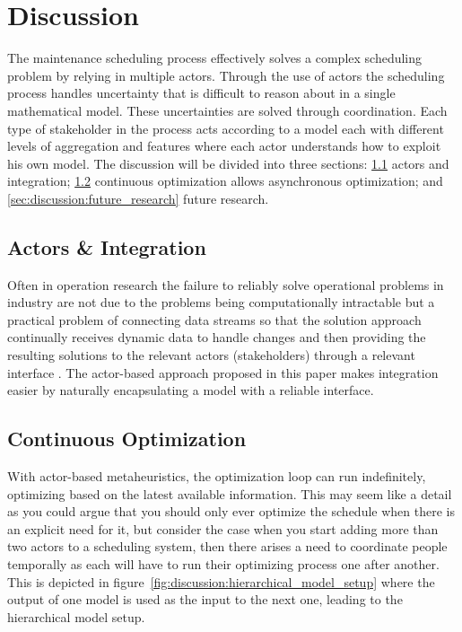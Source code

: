 \section{Discussion}
\label{sec:4-discussion}
The maintenance scheduling process effectively solves a complex scheduling problem by
relying in multiple actors. Through the use of actors the scheduling process handles
uncertainty that is difficult to reason about in a single mathematical model. These 
uncertainties are solved through coordination. Each type of stakeholder in the process 
acts according to a  model each with different levels of aggregation and features where
each actor understands how to exploit his own model.
The discussion will be divided into three sections: 
\ref{sec:discussion:actors_and_integration} 
actors and integration;
\ref{sec:discussion:continuous_optimization} 
continuous optimization allows asynchronous optimization; 
and \ref{sec:discussion:future_research} future research.

\subsection{Actors \& Integration}
\label{sec:discussion:actors_and_integration}
Often in operation research the failure to reliably solve operational
problems in  industry are not due to the problems being computationally
intractable \cite{gendreauHandbookMetaheuristics2019} but a practical
problem of connecting data streams so that the solution approach continually
receives dynamic data to handle changes and then providing the resulting
solutions to the relevant actors (stakeholders) through a relevant interface
\cite{meignanReviewTaxonomyInteractive2015}. The actor-based approach proposed
in this paper makes integration easier by naturally encapsulating a model with a
reliable interface.

\subsection{Continuous Optimization}
\label{sec:discussion:continuous_optimization}
With actor-based metaheuristics, the optimization loop can run indefinitely,
optimizing based on the latest available information. This may seem like a
detail as you could argue that you should only ever optimize the schedule
when there is an explicit need for it, but consider the case when you start
adding more than two actors to a scheduling system, then there arises a need
to coordinate people temporally as each will have to run their optimizing
process one after another. This is depicted in figure~\ref{fig:discussion:hierarchical_model_setup}
where the output of one model is used as the input to the next one, leading
to the hierarchical model setup.

